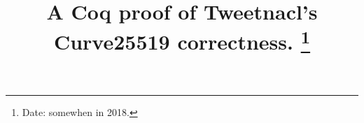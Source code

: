 \documentclass[letterpaper,twocolumn,9pt]{article}
\newif\ifpublic
\begin{document}
\date{}

\title{\Large \bf A Coq proof of Tweetnacl's Curve25519 correctness.%
\thanks{
Date: somewhen in 2018.}
}

\ifpublic
\author{
{\rm Peter Schwabe}\\
  Radboud University, The Netherlands\\
\and
{\rm Beno\^it Viguier}\\
  Radboud University, The Netherlands\\
\and
{\rm Timmy Weerwag}\\
  Radboud University, The Netherlands\\
\and
{\rm Freek Wiedijk}\\
  Radboud University, The Netherlands\\
}
\fi

\maketitle










\vspace*{1cm}
{\footnotesize 
}

\begin{appendix}
\end{appendix}
\end{document}
